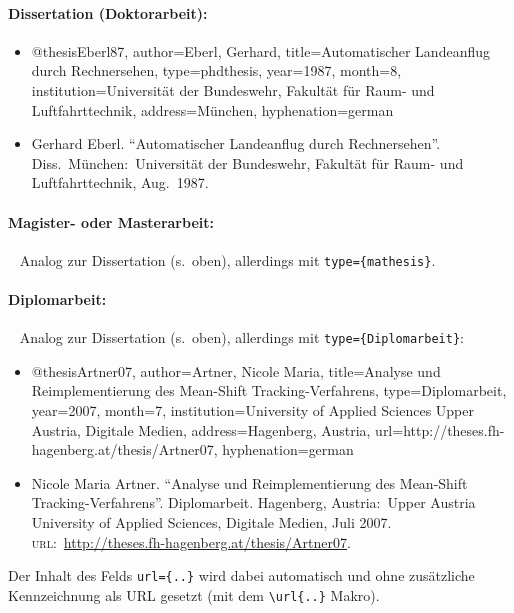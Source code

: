 \paragraph{Dissertation (Doktorarbeit):}
\begin{itemize}
\item[]
\begin{GenericCode}[numbers=none]
@thesis{Eberl87,
	author={Eberl, Gerhard},
	title={Automatischer Landeanflug durch Rechnersehen},
	type={phdthesis},
	year={1987},
	month={8},
	institution={Universität der Bundeswehr, Fakultät für Raum- und Luftfahrttechnik},
	address={München},
	hyphenation={german}
}
\end{GenericCode}
\item[\cite{Eberl87}]
Gerhard Eberl. "`Automatischer Landeanflug durch Rechnersehen"'.
Diss.\ München:\ Universität der Bundeswehr, Fakultät für Raum- und
Luftfahrttechnik, Aug.\ 1987.
\end{itemize}

\paragraph{Magister- oder Masterarbeit:} ~ \newline
Analog zur Dissertation (s.\ oben), allerdings mit \texttt{type=\{mathesis\}}.%


\paragraph{Diplomarbeit:} ~ \newline
Analog zur Dissertation (s.\ oben), allerdings mit \texttt{type=\optbreaknh\{Diplomarbeit\}}:%
%
\begin{itemize}
\item[]
\begin{GenericCode}[numbers=none]
@thesis{Artner07,
	author={Artner, Nicole Maria},
	title={Analyse und Reimplementierung des Mean-Shift Tracking-Verfahrens},
	type={Diplomarbeit},
	year={2007},
	month={7},
	institution={University of Applied Sciences Upper Austria, Digitale Medien},
	address={Hagenberg, Austria},
	url={http://theses.fh-hagenberg.at/thesis/Artner07},
  hyphenation={german}
}
\end{GenericCode}
\item[\cite{Artner07}]
Nicole Maria Artner. "`Analyse und Reimplementierung des Mean-Shift
Tracking-Verfahrens"'. Diplomarbeit. Hagenberg, Austria:\ Upper 
Austria University of Applied Sciences, Digitale Medien, Juli 2007. 
\textsc{url}:\ \url{http://theses.fh-hagenberg.at/thesis/Artner07}.
\end{itemize}
%
Der Inhalt des Felds \verb!url={..}! wird dabei automatisch und ohne zusätzliche
Kennzeichnung als URL gesetzt (mit dem \verb!\url{..}! Makro).

